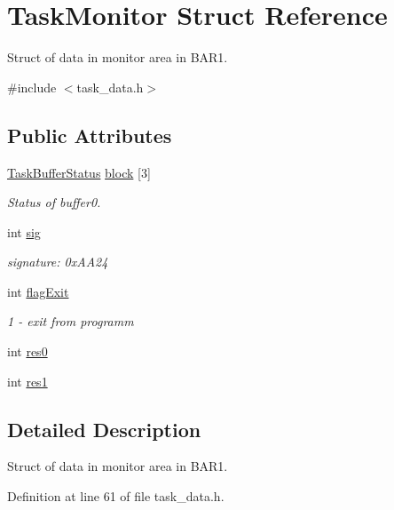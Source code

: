 \hypertarget{structTaskMonitor}{
\section{TaskMonitor Struct Reference}
\label{structTaskMonitor}
}


Struct of data in monitor area in BAR1.  


{\ttfamily \#include $<$task\_\-data.h$>$}\subsection*{Public Attributes}
\begin{DoxyCompactItemize}
\item 
\hyperlink{structTaskBufferStatus}{TaskBufferStatus} \hyperlink{structTaskMonitor_a2292dd95d5fff32a89158da1293f20fe}{block} \mbox{[}3\mbox{]}
\begin{DoxyCompactList}\small\item\em Status of buffer0. \item\end{DoxyCompactList}\item 
int \hyperlink{structTaskMonitor_ac6ff7600f359c32ee18e85d3ac923075}{sig}
\begin{DoxyCompactList}\small\item\em signature: 0xAA24 \item\end{DoxyCompactList}\item 
int \hyperlink{structTaskMonitor_a41a440978f13b970c075be89ebdb7ec4}{flagExit}
\begin{DoxyCompactList}\small\item\em 1 -\/ exit from programm \item\end{DoxyCompactList}\item 
int \hyperlink{structTaskMonitor_a41f47c7e06e461344d2db1dedf96f855}{res0}
\item 
int \hyperlink{structTaskMonitor_adddd04eb115df06c13900b986277d52c}{res1}
\end{DoxyCompactItemize}


\subsection{Detailed Description}
Struct of data in monitor area in BAR1. 

Definition at line 61 of file task\_\-data.h.

